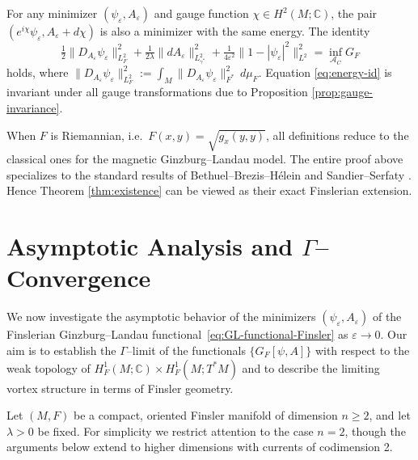 \documentclass[fleqn,11pt,twoside]{article}
\theoremstyle{definition}
\begin{document}

For any minimizer $(\psi_\varepsilon,A_\varepsilon)$ and gauge function $\chi\in H^2(M;\mathbb{C})$, the pair $(e^{i\chi}\psi_\varepsilon, A_\varepsilon+d\chi)$
is also a minimizer with the same energy. The identity
\begin{equation}\label{eq:energy-id}
   \tfrac 12 \|D_{A_\varepsilon}\psi_\varepsilon\|_{L^2_F}^2
   + \tfrac{1}{2\lambda}\|dA_\varepsilon\|_{L^2_{\gamma^*}}^2
   + \tfrac{1}{4\varepsilon^2}\|1-|\psi_\varepsilon|^2\|_{L^2}^2
   = \inf_{\mathcal{A}_C} G_F
\end{equation}
holds, where $\|D_{A_\varepsilon}\psi_\varepsilon\|_{L^2_F}^2
 := \int_M \|D_{A_\varepsilon}\psi_\varepsilon\|_{F^*}^2\, d\mu_F$.
Equation \eqref{eq:energy-id} is invariant under all gauge transformations due to Proposition \ref{prop:gauge-invariance}.


When $F$ is Riemannian, i.e.\ $F(x,y)=\sqrt{g_x(y,y)}$, all definitions reduce to the classical ones for the magnetic Ginzburg--Landau model. The entire proof above specializes to the standard results of Bethuel--Brezis--H\'elein \cite{BBH1994} and
Sandier--Serfaty \cite{SandierSerfaty2007}.
Hence Theorem \ref{thm:existence} can be viewed as their exact
Finslerian extension.

\section{Asymptotic Analysis and $\Gamma$--Convergence}
\label{sec:gamma}

We now investigate the asymptotic behavior of the minimizers
$(\psi_\varepsilon, A_\varepsilon)$ of the Finslerian Ginzburg--Landau functional~\eqref{eq:GL-functional-Finsler} as $\varepsilon\to 0$. Our aim is to establish the $\Gamma$--limit of the functionals $\{G_F[\psi,A]\}$ with respect to the weak topology of $H^1_F(M;\mathbb{C})\times H^1_F(M;T^*M)$ and to describe the limiting vortex structure in terms of Finsler geometry.

Let $(M,F)$ be a compact, oriented Finsler manifold of dimension $n\ge 2$, and let $\lambda>0$ be fixed. For simplicity we restrict attention to the case $n=2$, though the arguments below extend to higher dimensions with currents of codimension 2.
\end{document}
